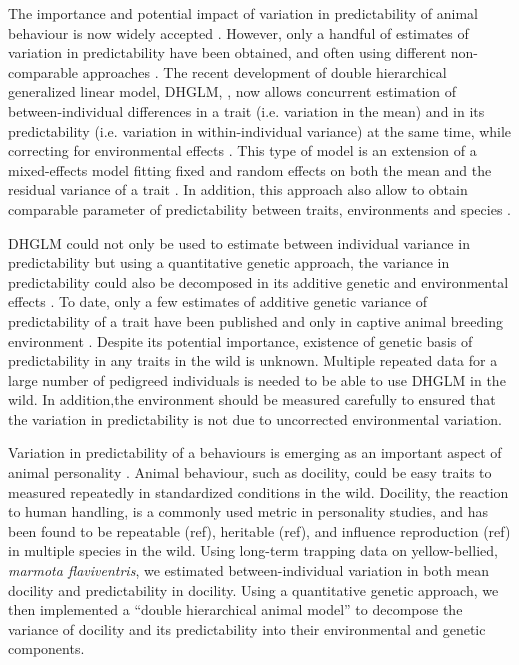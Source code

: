 \documentclass[a4paper,12pt,twoside]{article}
\begin{document}
	The importance and potential impact of variation in predictability of animal behaviour is now widely accepted \citep{Reale2009c, Stamps2012, Westneat2013}.
	However, only a handful of estimates of variation in predictability have been obtained, and often using different non-comparable approaches \citep{Cleasby2015}.
	The recent development of double hierarchical generalized linear model, DHGLM, \citep{Lee2006}, now allows concurrent estimation of between-individual differences in a trait (i.e. variation in the mean) and in its predictability (i.e. variation in within-individual variance) at the same time, while correcting for environmental effects \citep{Cleasby2015}.
	This type of model is an extension of a mixed-effects model fitting fixed and random effects on both the mean and the residual variance of a trait \citep{Lee2006,Cleasby2015}.
	In addition, this approach also allow to obtain comparable parameter of predictability between traits, environments and species \citep{Hill2010, Cleasby2015}.
	
	DHGLM could not only be used to estimate between individual variance in predictability but using a quantitative genetic approach, the variance in predictability could also be decomposed in its additive genetic and environmental effects \citep{Ronnegard2010, Sae-lim2015}.
	To date, only a few estimates of additive genetic variance of predictability of a trait have been published and only in captive animal breeding environment \citep{Mulder2015, Hill2010, Sae-lim2015}.
	Despite its potential importance, existence of genetic basis of predictability in any traits in the wild is unknown.
	Multiple repeated data for a large number of pedigreed individuals is needed to be able to use DHGLM in the wild. 
	In addition,the environment should be measured carefully to ensured that the variation in predictability is not due to uncorrected environmental variation.
	
	
	Variation in predictability of a behaviours is emerging as an important aspect of animal personality \citep{Stamps2012, Cleasby2015, Westneat2014}.
	Animal behaviour, such as docility, could be easy traits to measured repeatedly in standardized conditions in the wild.
	Docility, the reaction to human handling, is a commonly used metric in personality studies, and has been found to be repeatable (ref), heritable (ref), and influence reproduction (ref) in multiple species in the wild. 
	Using long-term trapping data on yellow-bellied, \textit{marmota flaviventris}, we estimated between-individual variation in both mean docility and predictability in docility.
	Using a quantitative genetic approach, we then implemented a “double hierarchical animal model” to decompose the variance of docility and its predictability into their environmental and genetic components.  
\end{document}
